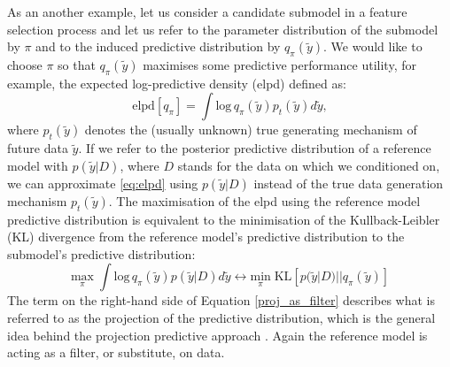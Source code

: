 \documentclass[american,]{article}
\theoremstyle{definition}
\begin{document}
 






As an another example, let us consider a candidate submodel in a
feature selection process and let us refer to the parameter
distribution of the submodel by $\pi$ and to the induced predictive
distribution by $q_{\pi}(\tilde{y})$. We would like to choose $\pi$ so
that $q_{\pi}(\tilde{y})$ maximises some predictive performance
utility, for example, the expected log-predictive density (elpd)
defined as: \
\begin{equation}\label{eq:elpd}
\text{elpd}[q_{\pi}]=\int \text{log}\,q_{\pi}(\tilde{y})p_{t}(\tilde{y})d\tilde{y},
\end{equation}
where $p_{t}(\tilde{y})$ denotes the (usually unknown) true generating
mechanism of future data $\tilde{y}$. If we refer to the posterior
predictive distribution of a reference model with $p(\tilde{y}|D)$,
where $D$ stands for the data on which we conditioned on, we can
approximate \eqref{eq:elpd} using $p(\tilde{y}|D)$ instead of the true
data generation mechanism $p_{t}(\tilde{y})$. The maximisation of the
elpd using the reference model predictive distribution is equivalent
to the minimisation of the Kullback-Leibler (KL) divergence from the
reference model's predictive distribution to the submodel's predictive
distribution: \
\begin{equation} \label{proj_as_filter}
\underset{\pi}{\text{max}} \; \int \text{log}\,q_{\pi}(\tilde{y})p(\tilde{y}|D)d\tilde{y} \leftrightarrow \underset{\pi}{\text{min}} \; \text{KL}[p(\tilde{y}|D)||q_{\pi}(\tilde{y})] 
\end{equation}
The term on the right-hand side of Equation \eqref{proj_as_filter}
describes what is referred to as the projection of the predictive
distribution, which is the general idea behind the projection
predictive approach \cite[see][]{paper:projpred}. Again the reference
model is acting as a filter, or substitute, on data.
\end{document}
